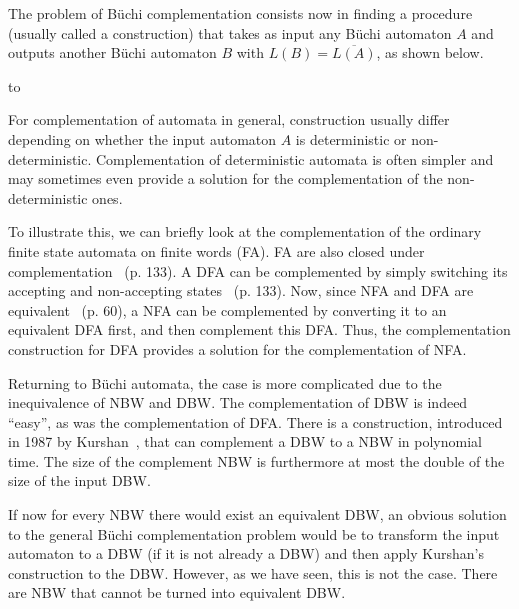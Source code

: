\documentclass[a4paper]{report}
\begin{document}
The problem of Büchi complementation consists now in finding a procedure (usually called a construction) that takes as input any Büchi automaton $A$ and outputs another Büchi automaton $B$ with $L(B) = \overline{L(A)}$, as shown below.

\hbox to 

For complementation of automata in general, construction usually differ depending on whether the input automaton $A$ is deterministic or non-deterministic. Complementation of deterministic automata is often simpler and may sometimes even provide a solution for the complementation of the non-deterministic ones.

To illustrate this, we can briefly look at the complementation of the ordinary finite state automata on finite words (FA). FA are also closed under complementation~\cite{hopcroft2006automata} (p. 133). A DFA can be complemented by simply switching its accepting and non-accepting states~\cite{hopcroft2006automata} (p. 133). Now, since NFA and DFA are equivalent~\cite{hopcroft2006automata} (p. 60), a NFA can be complemented by converting it to an equivalent DFA first, and then complement this DFA. Thus, the complementation construction for DFA provides a solution for the complementation of NFA.

Returning to Büchi automata, the case is more complicated due to the inequivalence of NBW and DBW. The complementation of DBW is indeed ``easy'', as was the complementation of DFA. There is a construction, introduced in 1987 by Kurshan~\cite{Kurshan198759}, that can complement a DBW to a NBW in polynomial time. The size of the complement NBW is furthermore at most the double of the size of the input DBW.

If now for every NBW there would exist an equivalent DBW, an obvious solution to the general Büchi complementation problem would be to transform the input automaton to a DBW (if it is not already a DBW) and then apply Kurshan's construction to the DBW. However, as we have seen, this is not the case. There are NBW that cannot be turned into equivalent DBW.
\end{document}

